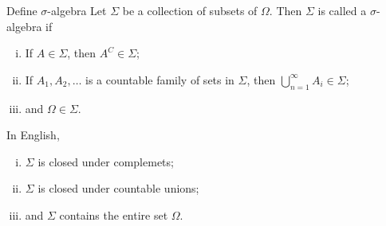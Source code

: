 \documentclass[avery5388,grid,frame]{flashcards}
\begin{document}
\begin{flashcard}
    {Define $\sigma$-algebra}
    Let $\Sigma$ be a collection of subsets of $\Omega$.  Then $\Sigma$ is called a $\sigma$-algebra if
    \begin{enumerate}[(i)]
        \item If $A \in \Sigma$, then $A^C \in \Sigma$;
        \item If $A_1, A_2,\dots$ is a countable family of sets in $\Sigma$, then $\bigcup_{n=1}^\infty A_i \in \Sigma$;
        \item and $\Omega \in \Sigma$.
    \end{enumerate}

    In English,
    \begin{enumerate}[(i)]
        \item $\Sigma$ is closed under complemets;
        \item $\Sigma$ is closed under countable unions;
        \item and $\Sigma$ contains the entire set $\Omega$.
    \end{enumerate}
\end{flashcard}
\end{document}
